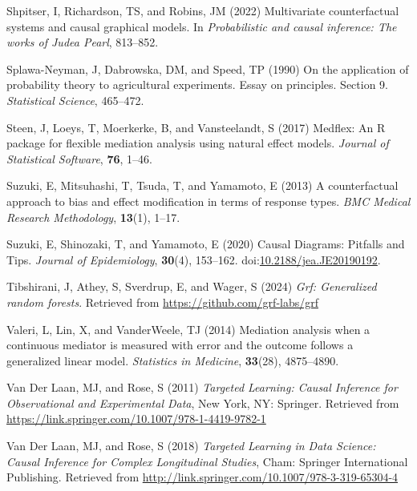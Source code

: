 \documentclass[
  single column]{article}
\newlength{\cslhangindent}
\newenvironment{CSLReferences}[2] %
 {\begin{list}{}{%
  \setlength{\itemindent}{0pt}
  \setlength{\leftmargin}{0pt}
  \setlength{\parsep}{0pt}
  \ifodd #1
   \setlength{\leftmargin}{\cslhangindent}
   \setlength{\itemindent}{-1\cslhangindent}
  \fi
  \setlength{\itemsep}{#2\baselineskip}}}
 {\end{list}}
\begin{document}
\begin{CSLReferences}{1}{0}
Shpitser, I, Richardson, TS, and Robins, JM (2022) Multivariate
counterfactual systems and causal graphical models. In
\emph{Probabilistic and causal inference: The works of {J}udea {P}earl},
813--852.

Splawa-Neyman, J, Dabrowska, DM, and Speed, TP (1990) On the application
of probability theory to agricultural experiments. Essay on principles.
Section 9. \emph{Statistical Science}, 465--472.

Steen, J, Loeys, T, Moerkerke, B, and Vansteelandt, S (2017) Medflex: An
{R} package for flexible mediation analysis using natural effect models.
\emph{Journal of Statistical Software}, \textbf{76}, 1--46.

Suzuki, E, Mitsuhashi, T, Tsuda, T, and Yamamoto, E (2013) A
counterfactual approach to bias and effect modification in terms of
response types. \emph{BMC Medical Research Methodology}, \textbf{13}(1),
1--17.

Suzuki, E, Shinozaki, T, and Yamamoto, E (2020) Causal Diagrams:
Pitfalls and Tips. \emph{Journal of Epidemiology}, \textbf{30}(4),
153--162.
doi:\href{https://doi.org/10.2188/jea.JE20190192}{10.2188/jea.JE20190192}.

Tibshirani, J, Athey, S, Sverdrup, E, and Wager, S (2024) \emph{Grf:
Generalized random forests}. Retrieved from
\url{https://github.com/grf-labs/grf}

Valeri, L, Lin, X, and VanderWeele, TJ (2014) Mediation analysis when a
continuous mediator is measured with error and the outcome follows a
generalized linear model. \emph{Statistics in Medicine},
\textbf{33}(28), 4875--4890.

Van Der Laan, MJ, and Rose, S (2011) \emph{Targeted Learning: Causal
Inference for Observational and Experimental Data}, New York, NY:
Springer. Retrieved from
\url{https://link.springer.com/10.1007/978-1-4419-9782-1}

Van Der Laan, MJ, and Rose, S (2018) \emph{Targeted Learning in Data
Science: Causal Inference for Complex Longitudinal Studies}, Cham:
Springer International Publishing. Retrieved from
\url{http://link.springer.com/10.1007/978-3-319-65304-4}


\end{CSLReferences}
\end{document}
